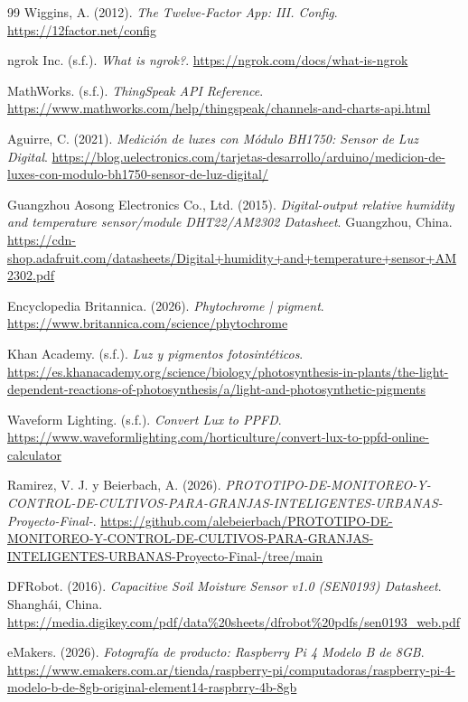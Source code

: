 \begin{thebibliography}{99}
Wiggins, A. (2012). \textit{The Twelve-Factor App: III. Config}. \url{https://12factor.net/config}

ngrok Inc. (s.f.). \textit{What is ngrok?}. \url{https://ngrok.com/docs/what-is-ngrok}

MathWorks. (s.f.). \textit{ThingSpeak API Reference}. \url{https://www.mathworks.com/help/thingspeak/channels-and-charts-api.html}

Aguirre, C. (2021). \textit{Medición de luxes con Módulo BH1750: Sensor de Luz Digital}. \url{https://blog.uelectronics.com/tarjetas-desarrollo/arduino/medicion-de-luxes-con-modulo-bh1750-sensor-de-luz-digital/}

Guangzhou Aosong Electronics Co., Ltd. (2015). \textit{Digital-output relative humidity and temperature sensor/module DHT22/AM2302 Datasheet}. Guangzhou, China. \url{https://cdn-shop.adafruit.com/datasheets/Digital+humidity+and+temperature+sensor+AM2302.pdf}

Encyclopedia Britannica. (2026). \textit{Phytochrome | pigment}. \url{https://www.britannica.com/science/phytochrome}

Khan Academy. (s.f.). \textit{Luz y pigmentos fotosintéticos}. \url{https://es.khanacademy.org/science/biology/photosynthesis-in-plants/the-light-dependent-reactions-of-photosynthesis/a/light-and-photosynthetic-pigments}

Waveform Lighting. (s.f.). \textit{Convert Lux to PPFD}. \url{https://www.waveformlighting.com/horticulture/convert-lux-to-ppfd-online-calculator}

Ramirez, V. J. y Beierbach, A. (2026). \textit{PROTOTIPO-DE-MONITOREO-Y-CONTROL-DE-CULTIVOS-PARA-GRANJAS-INTELIGENTES-URBANAS-Proyecto-Final-}. \url{https://github.com/alebeierbach/PROTOTIPO-DE-MONITOREO-Y-CONTROL-DE-CULTIVOS-PARA-GRANJAS-INTELIGENTES-URBANAS-Proyecto-Final-/tree/main}

DFRobot. (2016). \textit{Capacitive Soil Moisture Sensor v1.0 (SEN0193) Datasheet}. Shanghái, China. \url{https://media.digikey.com/pdf/data%20sheets/dfrobot%20pdfs/sen0193_web.pdf}

eMakers. (2026). \textit{Fotografía de producto: Raspberry Pi 4 Modelo B de 8GB}. \url{https://www.emakers.com.ar/tienda/raspberry-pi/computadoras/raspberry-pi-4-modelo-b-de-8gb-original-element14-raspbrry-4b-8gb}


\end{thebibliography}
